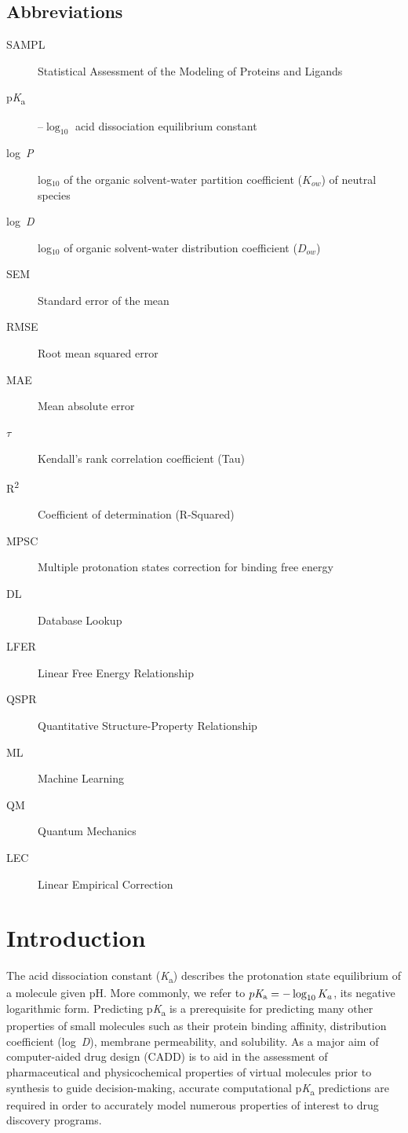 \documentclass[9pt,lineno,final]{elife}
\newcommand{\pKa}{p\textit{K}\textsubscript{a}}
\newcommand{\logD}{log~\textit{D}}
\newcommand{\logP}{log~\textit{P}}
\begin{document}
\subsection{Abbreviations}
\begin{description}
\item[SAMPL] Statistical Assessment of the Modeling of Proteins and Ligands
\item[\pKa]  --${\log_{10}}$ acid dissociation equilibrium constant 
\item[\logP] log$_{10}$ of the organic solvent-water partition coefficient ($K_{ow}$) of neutral species
\item[\logD] log$_{10}$ of organic solvent-water distribution coefficient ($D_{ow}$)
\item[SEM] Standard error of the mean
\item[RMSE] Root mean squared error
\item[MAE] Mean absolute error
\item[{$\tau$}] Kendall's rank correlation coefficient (Tau)
\item[R\textsuperscript{2}] Coefficient of determination (R-Squared)
\item[MPSC] Multiple protonation states correction for binding free energy
\item[DL] Database Lookup
\item[LFER] Linear Free Energy Relationship
\item[QSPR] Quantitative Structure-Property Relationship
\item[ML] Machine Learning
\item[QM] Quantum Mechanics
\item[LEC] Linear Empirical Correction
\end{description}


\section{Introduction}

The acid dissociation constant (\textit{K}\textsubscript{a}) describes the protonation state equilibrium of a molecule given pH.
More commonly, we refer to $\pKa{} = -\log_{10} K_a$, its negative logarithmic form. 
Predicting \pKa{} is a prerequisite for predicting many other properties of small molecules such as their protein binding affinity, distribution coefficient (\logD{}), membrane permeability, and solubility. 
As a major aim of computer-aided drug design (CADD) is to aid in the assessment of pharmaceutical and physicochemical properties of virtual molecules prior to synthesis to guide decision-making, accurate computational \pKa{} predictions are required in order to accurately model numerous properties of interest to drug discovery programs.
\end{document}
